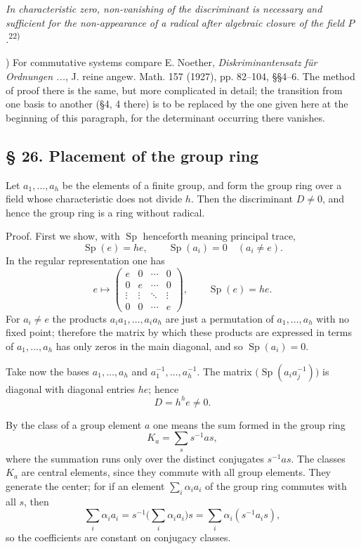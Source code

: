 \documentclass[11pt]{article}
\begin{document}
\emph{In characteristic zero, non-vanishing of the discriminant is necessary and sufficient for the non-appearance of a radical after algebraic closure of the field $P$.}\textsuperscript{22)}

{\footnotesize{}) For commutative systems compare E. Noether, \emph{Diskriminantensatz für Ordnungen ...}, J. reine angew. Math. 157 (1927), pp. 82--104, §§4--6. The method of proof there is the same, but more complicated in detail; the transition from one basis to another (§4, 4 there) is to be replaced by the one given here at the beginning of this paragraph, for the determinant occurring there vanishes.\par}

\subsection*{§ 26. Placement of the group ring}
Let $a_1,\ldots,a_h$ be the elements of a finite group, and form the group ring over a field whose characteristic does not divide $h$. Then the discriminant $D\ne0$, and hence the group ring is a ring without radical.

Proof. First we show, with $\operatorname{Sp}$ henceforth meaning principal trace,
\[
        \operatorname{Sp}(e)=he,
        \qquad
        \operatorname{Sp}(a_i)=0\quad (a_i\ne e).
\]
In the regular representation one has
\[
        e\mapsto\begin{pmatrix}e&0&\cdots&0\\0&e&\cdots&0\\\vdots&\vdots&\ddots&\vdots\\0&0&\cdots&e\end{pmatrix},
        \qquad \operatorname{Sp}(e)=he.
\]
For $a_i\ne e$ the products $a_i a_1,\ldots,a_i a_h$ are just a permutation of $a_1,\ldots,a_h$ with no fixed point; therefore the matrix by which these products are expressed in terms of $a_1,\ldots,a_h$ has only zeros in the main diagonal, and so $\operatorname{Sp}(a_i)=0$.

Take now the bases $a_1,\ldots,a_h$ and $a_1^{-1},\ldots,a_h^{-1}$. The matrix $\bigl(\operatorname{Sp}(a_i a_j^{-1})\bigr)$ is diagonal with diagonal entries $he$; hence
\[
        D=h^h e\ne0.
\]

By the class of a group element $a$ one means the sum formed in the group ring
\[
        K_a=\sum_s s^{-1}as,                              \tag{1}
\]
where the summation runs only over the distinct conjugates $s^{-1}as$. The classes $K_a$ are central elements, since they commute with all group elements. They generate the center; for if an element $\sum_i \alpha_i a_i$ of the group ring commutes with all $s$, then
\[
        \sum_i\alpha_i a_i=s^{-1}\biggl(\sum_i\alpha_i a_i\biggr)s
        =\sum_i\alpha_i(s^{-1}a_i s),
\]
so the coefficients are constant on conjugacy classes.
\end{document}
